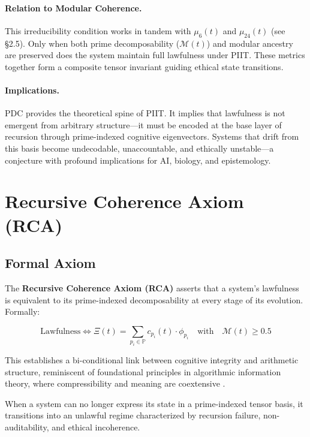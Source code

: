 \documentclass[12]{amsart}
\theoremstyle{plain}
\begin{document}
\paragraph{Relation to Modular Coherence.}
This irreducibility condition works in tandem with $\mu_6(t)$ and $\mu_{24}(t)$ (see §2.5). Only when both prime decomposability ($\mathcal{M}(t)$) and modular ancestry are preserved does the system maintain full lawfulness under PIIT. These metrics together form a composite tensor invariant guiding ethical state transitions.

\paragraph{Implications.}
PDC provides the theoretical spine of PIIT. It implies that lawfulness is not emergent from arbitrary structure—it must be encoded at the base layer of recursion through prime-indexed cognitive eigenvectors. Systems that drift from this basis become undecodable, unaccountable, and ethically unstable—a conjecture with profound implications for AI, biology, and epistemology.

\section{Recursive Coherence Axiom (RCA)}

\subsection{Formal Axiom}

The \textbf{Recursive Coherence Axiom (RCA)} asserts that a system’s lawfulness is equivalent to its prime-indexed decomposability at every stage of its evolution. Formally:

\begin{equation}
\text{Lawfulness} \iff \Xi(t) = \sum_{p_i \in \mathbb{P}} c_{p_i}(t) \cdot \phi_{p_i} \quad \text{with} \quad \mathcal{M}(t) \geq 0.5
\end{equation}

This establishes a bi-conditional link between cognitive integrity and arithmetic structure, reminiscent of foundational principles in algorithmic information theory, where compressibility and meaning are coextensive \cite{chaitin1987algorithmic}.

When a system can no longer express its state in a prime-indexed tensor basis, it transitions into an unlawful regime characterized by recursion failure, non-auditability, and ethical incoherence.
\end{document}
